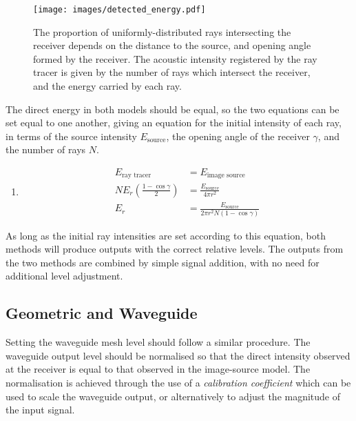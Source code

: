 \documentclass[]{scrreprt}
\providecommand{\tightlist}{%
  \setlength{\itemsep}{0pt}\setlength{\parskip}{0pt}}
\begin{document}
\begin{figure}[htbp]
\centering
\texttt{[image: images/detected\_energy.pdf]}
\caption{The proportion of uniformly-distributed rays intersecting the
receiver depends on the distance to the source, and opening angle formed
by the receiver. The acoustic intensity registered by the ray tracer is
given by the number of rays which intersect the receiver, and the energy
carried by each ray.\label{fig:detected_energy}}
\end{figure}

The direct energy in both models should be equal, so the two equations
can be set equal to one another, giving an equation for the initial
intensity of each ray, in terms of the source intensity
\(E_{\text{source}}\), the opening angle of the receiver \(\gamma\), and
the number of rays \(N\).

\begin{enumerate}
\def\labelenumi{(\arabic{enumi})}
\setcounter{enumi}{29}
\tightlist
\item
  \[
  \begin{aligned}
  E_{\text{ray tracer}} &= E_{\text{image source}} \\
  NE_r \left( \frac{1-\cos\gamma}{2} \right) &= \frac{E_{\text{source}}}{4\pi r^2} \\
  E_r &= \frac{E_{\text{source}}}{2 \pi r^2 N (1 - \cos\gamma)}
  \end{aligned}
  \]
\end{enumerate}

As long as the initial ray intensities are set according to this
equation, both methods will produce outputs with the correct relative
levels. The outputs from the two methods are combined by simple signal
addition, with no need for additional level adjustment.

\subsection{Geometric and Waveguide}\label{geometric-and-waveguide}

Setting the waveguide mesh level should follow a similar procedure. The
waveguide output level should be normalised so that the direct intensity
observed at the receiver is equal to that observed in the image-source
model. The normalisation is achieved through the use of a
\emph{calibration coefficient} which can be used to scale the waveguide
output, or alternatively to adjust the magnitude of the input signal.
\end{document}
